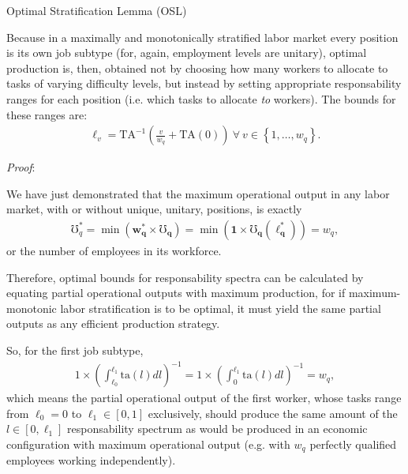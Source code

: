 \documentclass[hidelinks, nonatbib]{elsarticle}
\begin{document}
\begin{enumerate}
Optimal Stratification Lemma (OSL)

Because in a maximally and monotonically stratified labor market every position is its own job subtype (for, again, employment levels are unitary), optimal production is, then, obtained not by choosing how many workers to allocate to tasks of varying difficulty levels, but instead by setting appropriate responsability ranges for each position (i.e. which tasks to allocate \textit{to} workers). The bounds for these ranges are:
\begin{gather}
    \ell_v
    =
    \text{TA}^{-1}\left(
        \frac{v}{w_q}
        +
        \text{TA}(0)
    \right)
    \
    \forall
    \
    v \in 
    \left\{
        1, \dots, w_q
    \right\}
    .
\end{gather}

\textit{Proof}:

We have just demonstrated that the maximum operational output in any labor market, with or without unique, unitary, positions, is exactly 
\begin{gather}
    \mho_{q}^{*}
        =
        \min(
            \boldsymbol{w_{q}^{*}}
            \times
            \boldsymbol{\mho_q}
        )
        = 
        \min(
            \boldsymbol{1}
            \times
            \boldsymbol{\mho_q}(
                \boldsymbol{\ell_{q}^{*}}
            )
        )
        =
        w_q
    ,
\end{gather}
or the number of employees in its workforce.

Therefore, optimal bounds for responsability spectra can be calculated by equating partial operational outputs with maximum production, for if maximum-monotonic labor stratification is to be optimal, it must yield the same partial outputs as any efficient production strategy.

So, for the first job subtype,
\begin{gather}
    1 \times \left(
        \int_{\ell_0}^{\ell_1}
        \text{ta}(l)
        dl
    \right) ^ {-1}
    =
    1 \times \left(
        \int_{0}^{\ell_1}
        \text{ta}(l)
        dl
    \right) ^ {-1}
    =
    w_q
    ,
\end{gather}
which means the partial operational output of the first worker, whose tasks range from $\ell_0 = 0$ to $\ell_1 \in [0,1]$ exclusively, should produce the same amount of the $l \in [0,\ell_1]$ responsability spectrum as would be produced in an economic configuration with maximum operational output (e.g. with $w_q$ perfectly qualified employees working independently).


\end{enumerate}
\end{document}
